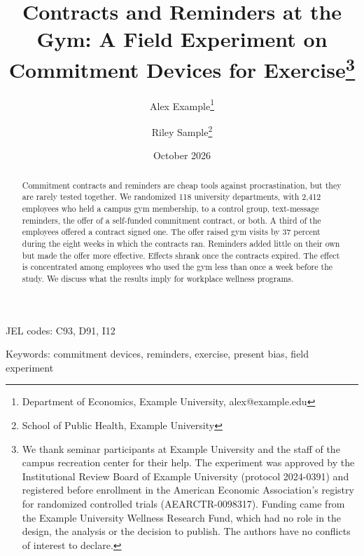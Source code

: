 \documentclass[12pt]{article}
\title{Contracts and Reminders at the Gym: A Field Experiment on Commitment Devices for Exercise\thanks{We thank seminar participants at Example University and the staff of the campus recreation center for their help. The experiment was approved by the Institutional Review Board of Example University (protocol 2024-0391) and registered before enrollment in the American Economic Association's registry for randomized controlled trials (AEARCTR-0098317). Funding came from the Example University Wellness Research Fund, which had no role in the design, the analysis or the decision to publish. The authors have no conflicts of interest to declare.}}
\author{Alex Example\thanks{Department of Economics, Example University, alex@example.edu} \and Riley Sample\thanks{School of Public Health, Example University}}
\date{October 2026}
\begin{document}
\maketitle
\begin{abstract}
Commitment contracts and reminders are cheap tools against procrastination, but they are rarely tested together. We randomized 118 university departments, with 2,412 employees who held a campus gym membership, to a control group, text-message reminders, the offer of a self-funded commitment contract, or both. A third of the employees offered a contract signed one. The offer raised gym visits by 37 percent during the eight weeks in which the contracts ran. Reminders added little on their own but made the offer more effective. Effects shrank once the contracts expired. The effect is concentrated among employees who used the gym less than once a week before the study. We discuss what the results imply for workplace wellness programs.
\end{abstract}

\noindent JEL codes: C93, D91, I12

\noindent Keywords: commitment devices, reminders, exercise, present bias, field experiment












\end{document}
